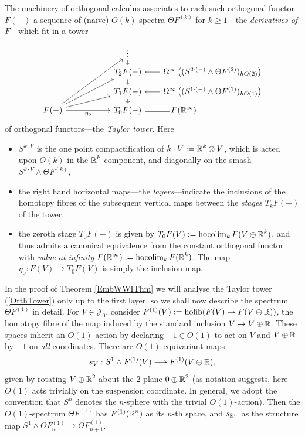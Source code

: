\documentclass[a4paper, oneside]{amsart}
\newcommand{\hofib}{\operatorname{hofib}}
\newcommand{\1}{\mathds{1}}
\theoremstyle{remark}
\theoremstyle{definition}
\newcommand{\R}{{\scaleobj{0.97}{\mathbb{R}}}}
\numberwithin{equation}{section}
\begin{document}
The machinery of orthogonal calculus associates to each such orthogonal functor $F(-)$ a sequence of (naïve) $O(k)$-spectra $\Theta F^{(k)}$ for $k\geq 1$---the \textit{derivatives of} $F$---which fit in a tower
\begin{equation}\label{OrthTower}
\begin{tikzcd}[row sep=tiny, column sep=scriptsize]
     &&& \vdots\dar &\\
     &&& T_2F(-)\dar &\lar \Omega^\infty\left((S^{2\cdot(-)}\wedge \Theta F^{(2)})_{hO(2)}\right)\\
     &&& T_1F(-)\dar &\lar \Omega^\infty\left((S^{1\cdot(-)}\wedge \Theta F^{(1)})_{hO(1)}\right)\\
     F(-)\ar[rrr, "\eta_0"']\arrow[urrr]\arrow[uurrr] \arrow[uuurrr] &&&T_0F(-)\rar[equal, shorten >=12ex]&\hspace{-70pt}F(\R^\infty)
\end{tikzcd}
\end{equation}
of orthogonal functors---the \textit{Taylor tower}. Here
\begin{itemize}
    \item $S^{k\cdot V}$ is the one point compactification of $k\cdot V:=\R^k\otimes V$, which is acted upon $O(k)$ in the $\R^k$ component, and diagonally on the smash $S^{k\cdot V}\wedge \Theta F^{(k)}$,
    
    \item the right hand horizontal maps---the \textit{layers}---indicate the inclusions of the homotopy fibres of the subsequent vertical maps between the \textit{stages} $T_k F(-)$ of the tower,

    \item the zeroth stage $T_0F(-)$ is given by
    $
    T_0F(V):=\operatorname{hocolim}_k F(V\oplus \R^k)
    $, and thus admits a canonical equivalence from the constant orthogonal functor with \textit{value at infinity} $F(\R^\infty):=\operatorname{hocolim}_k F(\R^k)$. The map $\eta_0: F(V)\to T_0F(V)$ is simply the inclusion map.
\end{itemize}

In the proof of Theorem \ref{EmbWWIThm} we will analyse the Taylor tower (\ref{OrthTower}) only up to the first layer, so we shall now describe the spectrum $\Theta F^{(1)}$ in detail. For $V\in \mathcal J_0$, consider $F^{(1)}(V):=\hofib(F(V)\to F(V\oplus \R))$, the homotopy fibre of the map induced by the standard inclusion $V\to V\oplus \R$. These spaces inherit an $O(1)$-action by declaring $-1\in O(1)$ to act on $V$ and $V\oplus \R$ by $-1$ on \textit{all} coordinates. There are $O(1)$-equivariant maps
\begin{equation}\label{orthstructuremap}
s_V: S^1\wedge F^{(1)}(V)\longrightarrow F^{(1)}(V\oplus \R),
\end{equation}
given by rotating $V\oplus \R^2$ about the $2$-plane $0\oplus \R^2$ (as notation suggests, here $O(1)$ acts trivially on the suspension coordinate. In general, we adopt the convention that $S^n$ denotes the $n$-sphere with the trivial $O(1)$-action). Then the $O(1)$-spectrum $\Theta F^{(1)}$ has $F^{(1)}(\R^n)$ as its $n$-th space, and $s_{\R^n}$ as the structure map $S^1\wedge\Theta F^{(1)}_n\to \Theta F^{(1)}_{n+1}$.
\end{document}
